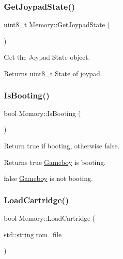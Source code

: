 \subsubsection{\texorpdfstring{Get\+Joypad\+State()}{GetJoypadState()}}
{\footnotesize\ttfamily uint8\+\_\+t Memory\+::\+Get\+Joypad\+State (\begin{DoxyParamCaption}{ }\end{DoxyParamCaption})\hspace{0.3cm}{\ttfamily [private]}}



Get the Joypad State object. 

\begin{DoxyReturn}{Returns}
uint8\+\_\+t State of joypad. 
\end{DoxyReturn}
\mbox{\label{classMemory_a39bd949ca21b0ecde1406c17cf7f3366}} 
\subsubsection{\texorpdfstring{Is\+Booting()}{IsBooting()}}
{\footnotesize\ttfamily bool Memory\+::\+Is\+Booting (\begin{DoxyParamCaption}{ }\end{DoxyParamCaption})}



Return true if booting, otherwise false. 

\begin{DoxyReturn}{Returns}
true \mbox{\hyperlink{classGameboy}{Gameboy}} is booting. 

false \mbox{\hyperlink{classGameboy}{Gameboy}} is not booting. 
\end{DoxyReturn}
\mbox{\label{classMemory_aa118a4c741282594d0c0d913ceac3da4}} 
\subsubsection{\texorpdfstring{Load\+Cartridge()}{LoadCartridge()}}
{\footnotesize\ttfamily bool Memory\+::\+Load\+Cartridge (\begin{DoxyParamCaption}\item[{std\+::string}]{rom\+\_\+file }\end{DoxyParamCaption})}



